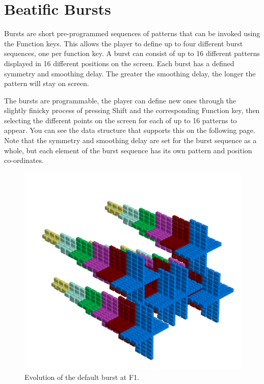 \chapter{Beatific Bursts} 
\label{sec:bursts}
\lstset{style=6502Style}
Bursts are short pre-programmed sequences of patterns that can be invoked using the Function keys.
This allows the player to define up to four different burst sequences, one per function key. A burst
can consist of up to 16 different patterns displayed in 16 different positions on the screen. Each burst
has a defined symmetry and smoothing delay. The greater the smoothing delay, the longer the pattern
will stay on screen.

The bursts are programmable, the player can define new ones through the slightly finicky process of pressing
Shift and the corresponding Function key, then selecting the different points on the screen for each of up
to 16 patterns to appear. You can see the data structure that supports this on the following page. Note
that the symmetry and smoothing delay are set for the burst sequence as a whole, but each element of the
burst sequence has its own pattern and position co-ordinates.

\clearpage
\begin{figure}[H]
    \centering
    \begin{adjustbox}{width=12cm,center}
      \includegraphics[width=12cm]{src/patterns/bursts/pattern0-45.png}%
    \end{adjustbox}
\caption{Evolution of the default burst at F1.}
\end{figure}
\clearpage

